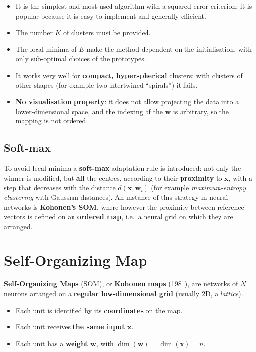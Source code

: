 \begin{itemize}
\tightlist
\item
  It is the simplest and most used algorithm with a squared error
  criterion; it is popular because it is easy to implement and
  generally efficient.
\item
  The number \(K\) of clusters must be provided.
\item
  The local minima of \(E\) make the method dependent on the
  initialisation, with only sub-optimal choices of the prototypes.
\item
  It works very well for \textbf{compact, hyperspherical} clusters;
  with clusters of other shapes (for example two intertwined
  ``spirals'') it fails.
\item
  \textbf{No visualisation property}: it does not allow projecting the
  data into a lower-dimensional space, and the indexing of the
  \(\mathbf{w}\) is arbitrary, so the mapping is not ordered.
\end{itemize}

\subsection{Soft-max}\label{soft-max}

To avoid local minima a \textbf{soft-max} adaptation rule is
introduced: not only the winner is modified, but \textbf{all} the
centres, according to their \textbf{proximity} to \(\mathbf{x}\), with
a step that decreases with the distance \(d(\mathbf{x}, \mathbf{w}_i)\)
(for example \emph{maximum-entropy clustering} with Gaussian
distances). An instance of this strategy in neural networks is
\textbf{Kohonen's SOM}, where however the proximity between reference
vectors is defined on an \textbf{ordered map}, i.e.\ a neural grid on
which they are arranged.

\section{Self-Organizing Map}\label{self-organizing-map}

\textbf{Self-Organizing Maps} (SOM), or \textbf{Kohonen maps} (1981),
are networks of \(N\) neurons arranged on a \textbf{regular
low-dimensional grid} (usually 2D, a \emph{lattice}).

\begin{itemize}
\tightlist
\item
  Each unit is identified by its \textbf{coordinates} on the map.
\item
  Each unit receives \textbf{the same input} \(\mathbf{x}\).
\item
  Each unit has a \textbf{weight} \(\mathbf{w}\), with
  \(\dim(\mathbf{w}) = \dim(\mathbf{x}) = n\).
\end{itemize}

